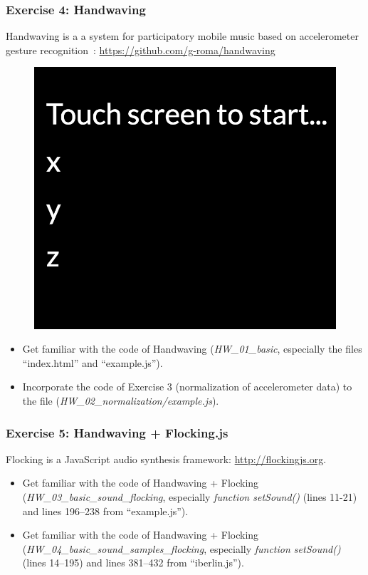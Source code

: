 \documentclass[screen, aspectratio=43]{beamer}
\begin{document}
%
\begin{frame}
  \frametitle{Exercise 4: Handwaving}
      Handwaving is a a system for participatory mobile music based on accelerometer gesture recognition~\cite{Roma.et.al.2017.handwaving}: \url{https://github.com/g-roma/handwaving}
       \begin{figure}
	\includegraphics[scale=0.12]{img/handwaving.png}
      \end{figure}  
    \begin{itemize}
    	\item Get familiar with the code of Handwaving (\emph{HW\_01\_basic}, especially the files ``index.html'' and ``example.js'').
	\item Incorporate the code of Exercise 3 (normalization of accelerometer data) to the file (\emph{HW\_02\_normalization/example.js}).
    \end{itemize}
\end{frame}
%
\begin{frame}
  \frametitle{Exercise 5: Handwaving + Flocking.js}
  Flocking is a JavaScript audio synthesis framework: \url{http://flockingjs.org}.
    \begin{itemize}
    	\item Get familiar with the code of Handwaving + Flocking (\emph{HW\_03\_basic\_sound\_flocking}, especially \emph{function setSound()} (lines 11-21) and lines 196--238 from ``example.js'').
	\item Get familiar with the code of Handwaving + Flocking (\emph{HW\_04\_basic\_sound\_samples\_flocking}, especially \emph{function setSound()}  (lines 14--195) and lines 381--432 from ``iberlin.js'').
    \end{itemize}
\end{frame}
\end{document}
